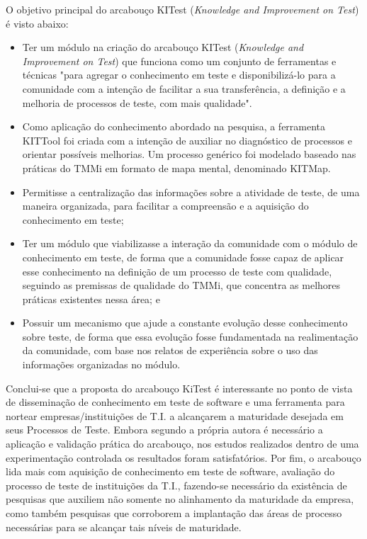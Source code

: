 O objetivo principal do arcabouço KITest (\textit{Knowledge and Improvement on Test}) é visto abaixo:

\begin{itemize}
\item Ter um módulo na criação do arcabouço KITest (\textit{Knowledge and Improvement on Test}) que funciona como um conjunto de ferramentas e técnicas "para agregar o conhecimento em teste e disponibilizá-lo para a comunidade com a intenção de facilitar a sua transferência, a definição e a melhoria de processos de teste, com mais qualidade".
\item Como aplicação do conhecimento abordado na pesquisa, a ferramenta KITTool foi criada com a intenção de auxiliar no diagnóstico de processos e orientar possíveis melhorias. Um processo genérico foi modelado baseado nas práticas do TMMi em formato de mapa mental, denominado KITMap.
\item Permitisse a centralização das informações sobre a atividade de teste, de uma maneira organizada, para facilitar a compreensão e a aquisição do conhecimento em teste;
\item Ter um módulo que viabilizasse a interação da comunidade com o módulo de conhecimento em teste, de forma que a comunidade fosse capaz de aplicar esse conhecimento na definição de um processo de teste com qualidade, seguindo as premissas de qualidade do TMMi, que concentra as melhores práticas existentes nessa área; e
\item Possuir um mecanismo que ajude a constante evolução desse conhecimento sobre teste, de forma que essa evolução fosse fundamentada na realimentação da comunidade, com base nos relatos de experiência sobre o uso das informações organizadas no módulo.
\end{itemize}

Conclui-se que a proposta do arcabouço KiTest é interessante no ponto de vista de disseminação de conhecimento em teste de software e uma ferramenta para nortear empresas/instituições de T.I. a alcançarem a maturidade desejada em seus Processos de Teste. Embora segundo a própria autora é necessário a aplicação e validação prática do arcabouço, nos estudos realizados dentro de uma experimentação controlada os resultados foram satisfatórios. Por fim, o arcabouço lida mais com aquisição de conhecimento em teste de software, avaliação do processo de teste de instituições da T.I., fazendo-se necessário da existência de pesquisas que auxiliem não somente no alinhamento da maturidade da empresa, como também pesquisas que corroborem a implantação das áreas de processo necessárias para se alcançar tais níveis de maturidade.

